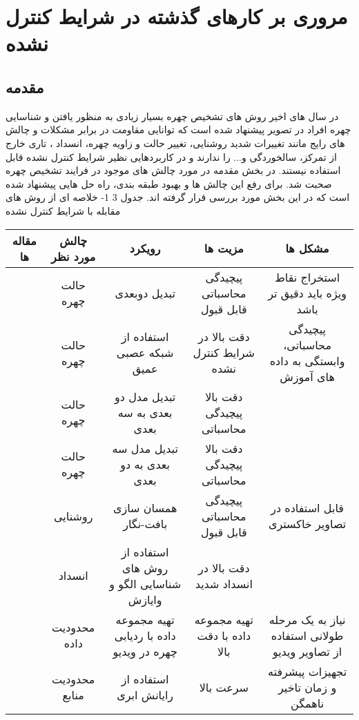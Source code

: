 \chapter{مروری بر کارهای گذشته در شرایط کنترل نشده}
\section{مقدمه}
در سال های اخیر روش های تشخیص چهره بسیار زیادی به منظور یافتن و شناسایی چهره افراد در تصویر پیشنهاد شده است که توانایی مقاومت در برابر مشکلات و چالش های رایج مانند تغییرات شدید روشنایی، تغییر حالت و زاویه چهره، انسداد ، تاری خارج از تمرکز، سالخوردگی و... را ندارند و در کاربردهایی نظیر شرایط کنترل نشده قابل استفاده نیستند. در بخش مقدمه در مورد چالش های موجود در فرایند تشخیص چهره صحبت شد. برای رفع این چالش ها و بهبود طبقه بندی، راه حل هایی پیشنهاد شده است که در این بخش مورد بررسی قرار گرفته اند.
جدول ‏3 1- خلاصه ای از روش های مقابله با شرایط کنترل نشده


\begin{center}
\begin{tabular}{|c c c c c|}
\hline 
مقاله ها & چالش مورد نظر & رویکرد & مزیت ها & مشکل ها
\\
\hline 
 [23-26] & حالت چهره	 & تبدیل دوبعدی & 	پیچیدگی محاسباتی قابل قبول & 	استخراج نقاط ویژه باید دقیق تر باشد
 \\
\hline
[22, 27-30] & حالت چهره & 	استفاده از شبکه عصبی عمیق & دقت بالا در شرایط کنترل نشده & 	پیچیدگی محاسباتی، وابستگی به داده های آموزش 
\\
\hline
[11, 31-34] & حالت چهره & 	تبدیل مدل دو بعدی به سه بعدی & 	دقت بالا 	پیچیدگی محاسباتی
\\
\hline
[35] & حالت چهره & 	تبدیل مدل سه بعدی به دو بعدی & 	دقت بالا 	پیچیدگی محاسباتی
\\
\hline
[26, 36] & روشنایی	 & همسان سازی بافت-نگار & 	پیچیدگی محاسباتی قابل قبول & 	قابل استفاده در تصاویر خاکستری
\\
\hline
[37, 38] & انسداد	 & استفاده از روش های شناسایی الگو و وایازش & 	دقت بالا در انسداد شدید	
\\
\hline
[39] & محدودیت داده	 & تهیه مجموعه داده با ردیابی چهره در ویدیو & 	تهیه مجموعه داده با دقت بالا & 	نیاز به یک مرحله طولانی استفاده از تصاویر ویدیو
\\
\hline
[40, 41] & محدودیت منابع & 	استفاده از رایانش ابری & 	سرعت بالا & 	تجهیزات پیشرفته و زمان تاخیر ناهمگن
\\
\hline
\end{tabular}
\end{center}

